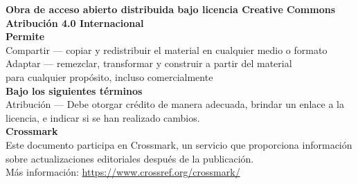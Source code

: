 \begin{center}
\small
\textbf{Obra de acceso abierto distribuida bajo licencia Creative Commons Atribución 4.0 Internacional}\\[0.5em]

\textbf{Permite}\\
Compartir — copiar y redistribuir el material en cualquier medio o formato\\
Adaptar — remezclar, transformar y construir a partir del material\\
para cualquier propósito, incluso comercialmente\\[0.5em]

\textbf{Bajo los siguientes términos}\\
Atribución — Debe otorgar crédito de manera adecuada, brindar un enlace a la licencia, e indicar si se han realizado cambios.\\[1em]

\textbf{Crossmark}\\
Este documento participa en Crossmark, un servicio que proporciona información\\
sobre actualizaciones editoriales después de la publicación.\\
Más información: \url{https://www.crossref.org/crossmark/}
\end{center}

\newpage